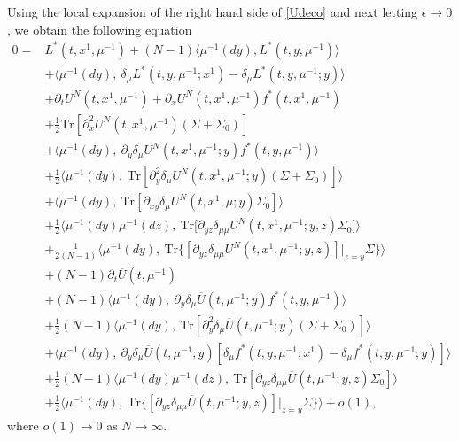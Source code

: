 \documentclass{amsart}
\theoremstyle{definition}
\theoremstyle{remark}
\numberwithin{equation}{section}
\begin{document}
Using the local expansion of the right hand side of \eqref{Udeco}
and next letting $\epsilon \to 0$,
we obtain the following  equation
{\allowdisplaybreaks
\begin{align*}
0=&  L^*(t,x^1, \mu^{-1}) + (N-1)\langle \mu^{-1} (dy) , L^*(t,y, \mu^{-1})  \rangle\\
 &+\langle\mu^{-1}(dy), \    \delta_\mu L^*( t, y, \mu^{-1};x^1)  -  \delta_\mu L^*( t, y, \mu^{-1};y)    \rangle \\
&+ \partial_t U^N(t, x^1, \mu^{-1})   + \partial_x U^N(t,x^1, \mu^{-1})f^*(t, x^1, \mu^{-1})  \\
& + \frac12 \mbox{Tr}[ \partial_x^2 U^N(t, x^1, \mu^{-1}) (\Sigma+\Sigma_0)]  \\
&+  \langle  \mu^{-1}(dy), \  \partial_y \delta_\mu U^N(t, x^1, \mu^{-1}; y)
f^*(t,y, \mu^{-1})    \rangle\\
&  +\frac12  \langle\mu^{-1}(dy) ,\    \mbox{Tr} [\partial_y^2 \delta_\mu U^N(t, x^1, \mu^{-1}; y) (\Sigma+\Sigma_0)]  \rangle\\
&+\langle \mu^{-1}(dy),\ \mbox{Tr} [\partial_{xy}\delta_\mu U^N(t,x^1, \mu; y)\Sigma_0 ]\rangle \\
& + \frac12\langle\mu^{-1}(dy) \mu^{-1}(dz), \    \mbox{Tr[}\partial_{yz} \delta_{\mu\mu} U^N(t, x^1, \mu^{-1};y,z) \Sigma_0  ]\rangle \\
&  +  \frac{1}{2(N-1)}\langle\mu^{-1}(dy) , \    \mbox{Tr}\{[\partial_{yz} \delta_{\mu\mu} U^N(t, x^1, \mu^{-1};y,z)]|_{z=y} \Sigma \} \rangle
\\
&+ (N-1)\partial_t \overline U (t, \mu^{-1})  \\
&+(N-1)
\langle \mu^{-1}(dy), \ \partial_y\delta_\mu \overline U(t, \mu^{-1}; y) f^*(t, y, \mu^{-1})\rangle \\
& +\frac12(N-1)\langle\mu^{-1}(dy),\   \mbox{Tr}[\partial_{y}^2\delta_\mu \overline U(t, \mu^{-1}; y)(\Sigma+\Sigma_0) ]  \rangle \\
&+ \langle \mu^{-1}(dy),\   \partial_y\delta_\mu \overline U(t, \mu^{-1}; y)[  \delta_\mu f^*(t, y, \mu^{-1}; x^1)- \delta_\mu f^*(t, y, \mu^{-1}; y) ]  \rangle \\
&+ \frac12 (N-1)\langle\mu^{-1}(dy) \mu^{-1}(dz), \    \mbox{Tr}[\partial_{yz} \delta_{\mu\mu}\overline U(t, \mu^{-1};y,z) \Sigma_0  ]\rangle \\
& +  \frac12\langle\mu^{-1}(dy) , \    \mbox{Tr}\{[\partial_{yz} \delta_{\mu\mu} \overline U(t, \mu^{-1};y,z)]|_{z=y} \Sigma \} \rangle
+o(1) ,
\end{align*}
}
where $o(1)\to 0$ as $N\to\infty$.
\end{document}
